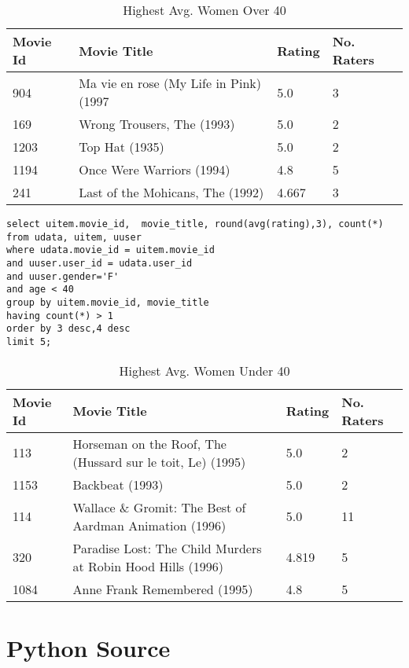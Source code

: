 \documentclass[letterpaper,11pt]{report}
\begin{document}
\begin{savenotes}
\begin{enumerate}
\begin{table}[htbp]
\centering
    \begin{tabular}{|l|l|l|l|}
    \hline
    Movie Id & Movie Title                            & Rating & No. Raters \\ \hline
    904      & Ma vie en rose (My Life in Pink) (1997 & 5.0    & 3          \\ \hline
    169      & Wrong Trousers, The (1993)             & 5.0    & 2          \\ \hline
    1203     & Top Hat (1935)                         & 5.0    & 2          \\ \hline
    1194     & Once Were Warriors (1994)              & 4.8    & 5          \\ \hline
    241      & Last of the Mohicans, The (1992)       & 4.667  & 3          \\ \hline
    \end{tabular}
    \caption {Highest Avg. Women Over 40}
		\label{tab:Wover40}
\end{table}

\begin{verbatim}
select uitem.movie_id,  movie_title, round(avg(rating),3), count(*) 
from udata, uitem, uuser 
where udata.movie_id = uitem.movie_id 
and uuser.user_id = udata.user_id 
and uuser.gender='F' 
and age < 40 
group by uitem.movie_id, movie_title 
having count(*) > 1 
order by 3 desc,4 desc 
limit 5;
\end{verbatim}

\begin{table}[htbp]
\centering
    \begin{tabular}{|l|l|l|l|}
    \hline
    Movie Id & Movie Title                                                 & Rating & No. Raters \\ \hline
    113      & Horseman on the Roof, The (Hussard sur le toit, Le) (1995)  & 5.0    & 2          \\ \hline
    1153     & Backbeat (1993)                                             & 5.0    & 2          \\ \hline
    114      & Wallace \& Gromit: The Best of Aardman Animation (1996)     & 5.0    & 11         \\ \hline
    320      & Paradise Lost: The Child Murders at Robin Hood Hills (1996) & 4.819  & 5          \\ \hline
    1084     & Anne Frank Remembered (1995)                                & 4.8    & 5          \\ \hline
    \end{tabular}
    \caption {Highest Avg. Women Under 40}
		\label{tab:Wunder40}
\end{table}
\end{enumerate}


\end{savenotes}




\appendix
{}

\chapter{Python Source} \label{chap:python}

\end{document}
